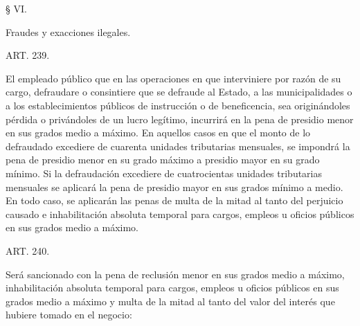     § VI.

    Fraudes y exacciones ilegales.



    ART. 239.

    El empleado público que en las operaciones en que interviniere por razón de su cargo, defraudare o consintiere que se defraude al Estado, a las municipalidades o a los establecimientos públicos de instrucción o de beneficencia, sea originándoles pérdida o privándoles de un lucro legítimo, incurrirá en la pena de presidio menor en sus grados medio a máximo.
    En aquellos casos en que el monto de lo defraudado excediere de cuarenta unidades tributarias mensuales, se impondrá la pena de presidio menor en su grado máximo a presidio mayor en su grado mínimo.
    Si la defraudación excediere de cuatrocientas unidades tributarias mensuales se aplicará la pena de presidio mayor en sus grados mínimo a medio.
    En todo caso, se aplicarán las penas de multa de la mitad al tanto del perjuicio causado e inhabilitación absoluta temporal para cargos, empleos u oficios públicos en sus grados medio a máximo.


    ART. 240.

    Será sancionado con la pena de reclusión menor en sus grados medio a máximo, inhabilitación absoluta temporal para cargos, empleos u oficios públicos en sus grados medio a máximo y multa de la mitad al tanto del valor del interés que hubiere tomado en el negocio:
   
